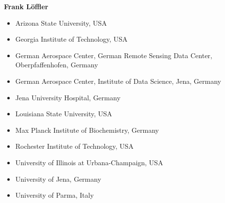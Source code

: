 \documentclass[11pt,a4paper,DIV=11]{scrlttr2}
\begin{document}
\begin{letter}{}
\textbf{Frank Löffler}
\begin{itemize}
 \setlength\itemsep{0em}
\item Arizona State University, USA
\item Georgia Institute of Technology, USA
\item German Aerospace Center, German Remote Sensing Data Center, Oberpfaffenhofen, Germany
\item German Aerospace Center, Institute of Data Science, Jena, Germany
\item Jena University Hospital, Germany
\item Louisiana State University, USA
\item Max Planck Institute of Biochemistry, Germany
\item Rochester Institute of Technology, USA
\item University of Illinois at Urbana-Champaign, USA
\item University of Jena, Germany
\item University of Parma, Italy
\end{itemize}



\end{letter}
\end{document}
